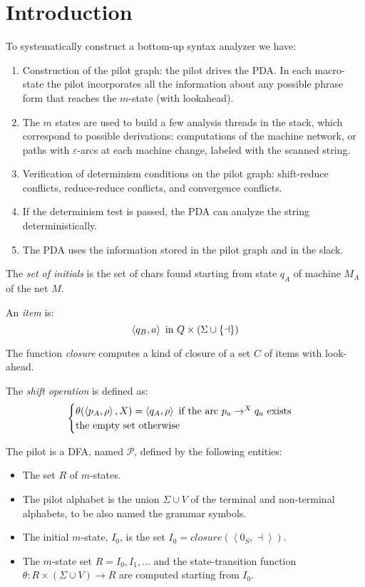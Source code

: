 \section{Introduction}

To systematically construct a bottom-up syntax analyzer we have: 
\begin{enumerate}
    \item Construction of the pilot graph: the pilot drives the PDA. In each macro-state the pilot incorporates all the information about any possible phrase form that
        reaches the $m$-state (with lookahead). 
    \item The $m$ states are used to build a few analysis threads in the stack, which correspond to possible derivations: computations of the machine network, or paths 
        with $\varepsilon$-arcs at each machine change, labeled with the scanned string. 
    \item Verification of determinism conditions on the pilot graph: shift-reduce conflicts, reduce-reduce conflicts, and convergence conflicts. 
    \item If the determinism test is passed, the PDA can analyze the string deterministically.
    \item The PDA uses the information stored in the pilot graph and in the slack. 
\end{enumerate}
\begin{definition}
    The \emph{set of initials} is the set of chars found starting from state $q_A$ of machine $M_A$ of the net $M$.
    
    An \emph{item} is: 
    \[\left\langle q_B,a\right\rangle \textnormal{ in } Q \times (\Sigma \cup \{\dashv\})\]

    The function \emph{closure} computes a kind of closure of a set $C$ of items with look-ahead. 

    The \emph{shift operation} is defined as: 
    \[
    \begin{cases}
        \theta(\left\langle p_A,\rho\right\rangle,X)=\left\langle q_A,\rho\right\rangle \textnormal{ if the arc } p_a \rightarrow^X q_a \textnormal{ exists} \\
        \textnormal{the empty set otherwise}
    \end{cases}    
    \]
\end{definition}

The pilot is a DFA, named $\mathcal{P}$, defined by the following entities:
\begin{itemize}
    \item The set $R$ of $m$-states. 
    \item The pilot alphabet is the union $\Sigma\cup V$ of the terminal and non-terminal alphabets, to be also named the grammar symbols.
    \item The initial $m$-state, $I_0$, is the set $I_0=closure(\left\langle 0_S,\dashv \right\rangle )$. 
    \item The $m$-state set $R={I_0,I_1,\dots}$ and the state-transition function $\theta:R \times (\Sigma \cup V) \rightarrow R$ are computed starting from $I_0$. 
\end{itemize}